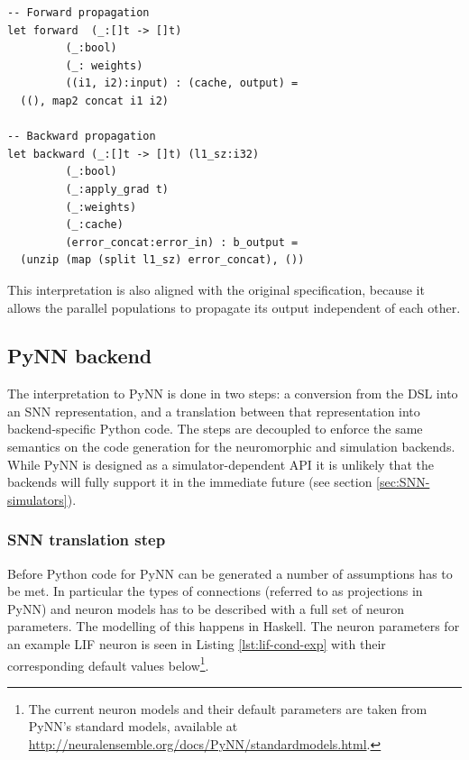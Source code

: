 \begin{lstlisting}[caption={Functions for forward and backward propagation in
the merge layer.}]
-- Forward propagation
let forward  (_:[]t -> []t)
	     (_:bool)
	     (_: weights)
	     ((i1, i2):input) : (cache, output) =
  ((), map2 concat i1 i2)

-- Backward propagation
let backward (_:[]t -> []t) (l1_sz:i32)
	     (_:bool)
	     (_:apply_grad t)
	     (_:weights)
	     (_:cache)
	     (error_concat:error_in) : b_output =
  (unzip (map (split l1_sz) error_concat), ())
\end{lstlisting}

This interpretation is also aligned with the original specification, 
because it allows the parallel populations to propagate its output
independent of each other.

\subsection{PyNN backend}
The interpretation to PyNN is done in two steps: a
conversion from the \gls{DSL} into an \gls{SNN} representation,
and a translation between that representation into backend-specific
Python code.
The steps are decoupled to enforce the same semantics on the code
generation for the neuromorphic and simulation backends.
While PyNN is designed as a simulator-dependent \gls{API} 
it is unlikely that the backends will fully support it in the
immediate future (see section \ref{sec:SNN-simulators}).

\subsubsection{\gls{SNN} translation step}
Before Python code for PyNN can be generated a number of assumptions
has to be met. 
In particular the types of connections (referred to as projections in PyNN)
and neuron models has to be described with a full set of neuron parameters.
The modelling of this happens in Haskell.
The neuron parameters for an example LIF neuron is seen in Listing
\ref{lst:lif-cond-exp} with their corresponding default values
below\footnote{
The current neuron models and their default parameters are taken from PyNN's
standard models, available at
\url{http://neuralensemble.org/docs/PyNN/standardmodels.html}.
}.

